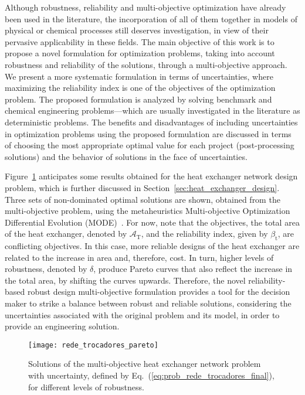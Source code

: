 \documentclass[final,5p,times,twocolumn,numbers]{elsarticle}
\begin{document}
Although robustness, reliability and multi-objective optimization have already been used in the literature, the incorporation of all of them together in models of physical or chemical processes still deserves investigation, in view of their pervasive applicability in these fields. The main objective of this work is to propose a novel formulation for optimization problems, taking into account robustness and reliability of the solutions, through a multi-objective approach. We present a more systematic formulation in terms of uncertainties, where maximizing the reliability index is one of the objectives of the optimization problem. The proposed formulation is analyzed by solving benchmark and chemical engineering problems---which are usually investigated in the literature as deterministic problems. The benefits and disadvantages of including uncertainties in optimization problems using the proposed formulation are discussed in terms of choosing the most appropriate optimal value for each project (post-processing solutions) and the behavior of solutions in the face of uncertainties.

Figure~\ref{fig:rede_trocadores_pareto} anticipates some results obtained for the heat exchanger network design problem, which is further discussed in Section~\ref{sec:heat_exchanger_design}. Three sets of non-dominated optimal solutions are shown, obtained from the multi-objective problem, using the metaheuristics Multi-objective Optimization Differential Evolution (MODE)~\cite{bib:lobato2011}. For now, note that the objectives, the total area of the heat exchanger, denoted by $ \mathcal{A}_{\mathrm{T}} $, and the reliability index, given by $ \beta_{\mathrm{t}} $, are conflicting objectives. In this case, more reliable designs of the heat exchanger are related to the increase in area and, therefore, cost. In turn, higher levels of robustness, denoted by $ \delta $, produce Pareto curves that also reflect the increase in the total area, by shifting the curves upwards. Therefore, the novel reliability-based robust design multi-objective formulation provides a tool for the decision maker to strike a balance between robust and reliable solutions, considering the uncertainties associated with the original problem and its model, in order to provide an engineering solution.

\begin{figure}
    \centering
    \texttt{[image: rede\_trocadores\_pareto]}
    \caption{Solutions of the multi-objective heat exchanger network problem with uncertainty, defined by Eq.~(\ref{eq:prob_rede_trocadores_final}), for different levels of robustness.}
    \label{fig:rede_trocadores_pareto}
\end{figure}
\end{document}
